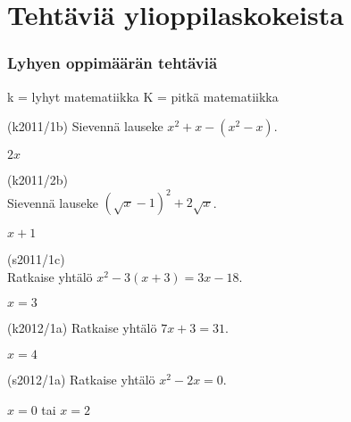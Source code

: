 \section{Tehtäviä ylioppilaskokeista}

\subsubsection*{Lyhyen oppimäärän tehtäviä}

k = lyhyt matematiikka
K = pitkä matematiikka


\begin{tehtava}
(k2011/1b) Sievennä lauseke $x^2+x-(x^2-x)$.
\begin{vastaus}
$2x$
\end{vastaus}
\end{tehtava}

\begin{tehtava}
(k2011/2b) \\ Sievennä lauseke $(\sqrt{x}-1)^2+2\sqrt{x}$.
\begin{vastaus}
$x+1$
\end{vastaus}
\end{tehtava}

\begin{tehtava}
(s2011/1c) \\ Ratkaise yhtälö $x^2-3(x+3) = 3x-18$.
\begin{vastaus}
$x=3$
\end{vastaus}
\end{tehtava}

\begin{tehtava}
(k2012/1a) Ratkaise yhtälö $7x+3 = 31$.
\begin{vastaus}
$x = 4$
\end{vastaus}
\end{tehtava}

\begin{tehtava}
(s2012/1a) Ratkaise yhtälö $x^2-2x = 0$.
\begin{vastaus}
$x=0$ tai $x=2$
\end{vastaus}
\end{tehtava}

